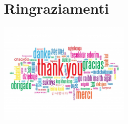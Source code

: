 \documentclass[xcolor=x11names,compress, 
]{beamer}
\theoremstyle{definition} \newtheorem{esempio}{Esempio}
\theoremstyle{definition}
\begin{document}
\section*{Ringraziamenti}
	\begin{frame}
		\begin{center}
			\includegraphics[width=6.5cm]{./immagini/thanks}
		\end{center}
	\end{frame}
\end{document}

